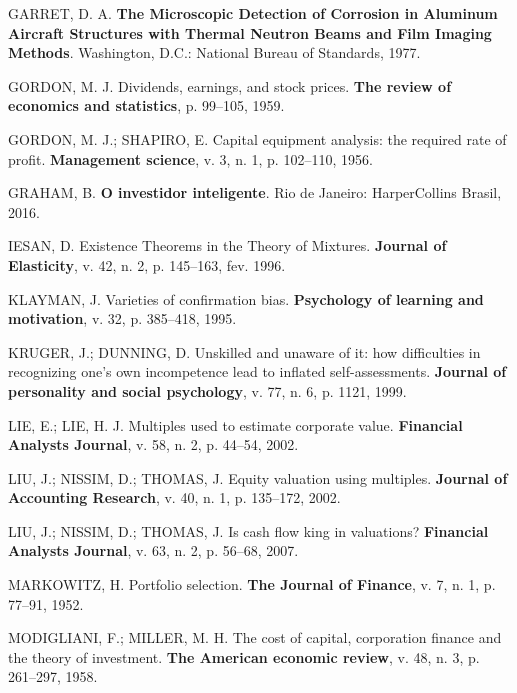 \documentclass[grad,numbers]{coppe}
\newenvironment{cslreferences}%
  {}%
  {\par}
\begin{document}
\begin{cslreferences}
  \leavevmode\hypertarget{ref-techreport-exampleIn}{}%
  GARRET, D. A. \textbf{The Microscopic Detection of Corrosion in Aluminum Aircraft Structures with Thermal Neutron Beams and Film Imaging Methods}. Washington, D.C.: National Bureau of Standards, 1977.

  \leavevmode\hypertarget{ref-gordon1959}{}%
  GORDON, M. J. Dividends, earnings, and stock prices. \textbf{The review of economics and statistics}, p. 99--105, 1959.

  \leavevmode\hypertarget{ref-gordon1956}{}%
  GORDON, M. J.; SHAPIRO, E. Capital equipment analysis: the required rate of profit. \textbf{Management science}, v. 3, n. 1, p. 102--110, 1956.

  \leavevmode\hypertarget{ref-graham2016}{}%
  GRAHAM, B. \textbf{O investidor inteligente}. Rio de Janeiro: HarperCollins Brasil, 2016.

  \leavevmode\hypertarget{ref-article-example}{}%
  IESAN, D. Existence Theorems in the Theory of Mixtures. \textbf{Journal of Elasticity}, v. 42, n. 2, p. 145--163, fev. 1996.

  \leavevmode\hypertarget{ref-klayman1995}{}%
  KLAYMAN, J. Varieties of confirmation bias. \textbf{Psychology of learning and motivation}, v. 32, p. 385--418, 1995.

  \leavevmode\hypertarget{ref-kruger1999}{}%
  KRUGER, J.; DUNNING, D. Unskilled and unaware of it: how difficulties in recognizing one's own incompetence lead to inflated self-assessments. \textbf{Journal of personality and social psychology}, v. 77, n. 6, p. 1121, 1999.

  \leavevmode\hypertarget{ref-lie2002}{}%
  LIE, E.; LIE, H. J. Multiples used to estimate corporate value. \textbf{Financial Analysts Journal}, v. 58, n. 2, p. 44--54, 2002.

  \leavevmode\hypertarget{ref-liu2002}{}%
  LIU, J.; NISSIM, D.; THOMAS, J. Equity valuation using multiples. \textbf{Journal of Accounting Research}, v. 40, n. 1, p. 135--172, 2002.

  \leavevmode\hypertarget{ref-liu2007}{}%
  LIU, J.; NISSIM, D.; THOMAS, J. Is cash flow king in valuations? \textbf{Financial Analysts Journal}, v. 63, n. 2, p. 56--68, 2007.

  \leavevmode\hypertarget{ref-markowitz1952}{}%
  MARKOWITZ, H. Portfolio selection. \textbf{The Journal of Finance}, v. 7, n. 1, p. 77--91, 1952.

  \leavevmode\hypertarget{ref-modigliani1958}{}%
  MODIGLIANI, F.; MILLER, M. H. The cost of capital, corporation finance and the theory of investment. \textbf{The American economic review}, v. 48, n. 3, p. 261--297, 1958.


\end{cslreferences}
\end{document}
